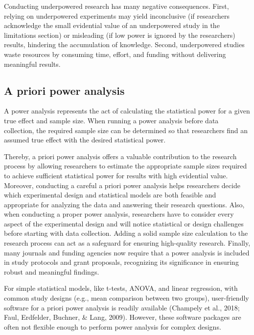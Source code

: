 \documentclass[
  man,floatsintext]{apa6}
\begin{document}
Conducting underpowered research has many negative consequences. First, relying on underpowered experiments may yield inconclusive (if researchers acknowledge the small evidential value of an underpowered study in the limitations section) or misleading (if low power is ignored by the researchers) results, hindering the accumulation of knowledge. Second, underpowered studies waste resources by consuming time, effort, and funding without delivering meaningful results.

\hypertarget{a-priori-power-analysis}{%
\subsection{A priori power analysis}\label{a-priori-power-analysis}}

A power analysis represents the act of calculating the statistical power for a given true effect and sample size.
When running a power analysis before data collection, the required sample size can be determined so that researchers find an assumed true effect with the desired statistical power.

Thereby, a priori power analysis offers a valuable contribution to the research process by allowing researchers to estimate the appropriate sample sizes required to achieve sufficient statistical power for results with high evidential value.
Moreover, conducting a careful a priori power analysis helps researchers decide which experimental design and statistical models are both feasible and appropriate for analyzing the data and answering their research questions.
Also, when conducting a proper power analysis, researchers have to consider every aspect of the experimental design and will notice statistical or design challenges before starting with data collection.
Adding a solid sample size calculation to the research process can act as a safeguard for ensuring high-quality research.
Finally, many journals and funding agencies now require that a power analysis is included in study protocols and grant proposals, recognizing its significance in ensuring robust and meaningful findings.

For simple statistical models, like t-tests, ANOVA, and linear regression, with common study designs (e.g., mean comparison between two groups), user-friendly software for a priori power analysis is readily available (Champely et al., 2018; Faul, Erdfelder, Buchner, \& Lang, 2009).
However, these software packages are often not flexible enough to perform power analysis for complex designs.
\end{document}
